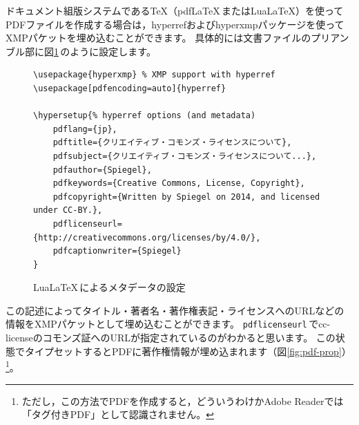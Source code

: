 \documentclass{ltjsarticle}
\begin{document}
ドキュメント組版システムである\TeX（pdf\LaTeX\,またはLua\LaTeX）を使ってPDFファイルを作成する場合は，hyperrefおよびhyperxmpパッケージを使ってXMPパケットを埋め込むことができます。
具体的には文書ファイルのプリアンブル部に図\ref{fig:hyperxmp}\,のように設定します。
\begin{figure}[htp]
\begin{mdframed}
\small
\begin{verbatim}
\usepackage{hyperxmp} % XMP support with hyperref
\usepackage[pdfencoding=auto]{hyperref}

\hypersetup{% hyperref options (and metadata)
    pdflang={jp},
    pdftitle={クリエイティブ・コモンズ・ライセンスについて},
    pdfsubject={クリエイティブ・コモンズ・ライセンスについて...},
    pdfauthor={Spiegel},
    pdfkeywords={Creative Commons, License, Copyright},
    pdfcopyright={Written by Spiegel on 2014, and licensed under CC-BY.},
    pdflicenseurl={http://creativecommons.org/licenses/by/4.0/},
    pdfcaptionwriter={Spiegel}
}
\end{verbatim}
\end{mdframed}
\caption{Lua\LaTeX\,によるメタデータの設定} \label{fig:hyperxmp}
\end{figure}%
この記述によってタイトル・著者名・著作権表記・ライセンスへのURLなどの情報をXMPパケットとして埋め込むことができます。
\verb|pdflicenseurl|\,でcc-licenseのコモンズ証へのURLが指定されているのがわかると思います。
この状態でタイプセットするとPDFに著作権情報が埋め込まれます（図\ref{fig:pdf-prop}）\footnote{ただし，この方法でPDFを作成すると，どういうわけかAdobe Readerでは「タグ付きPDF」として認識されません。}。
\end{document}
